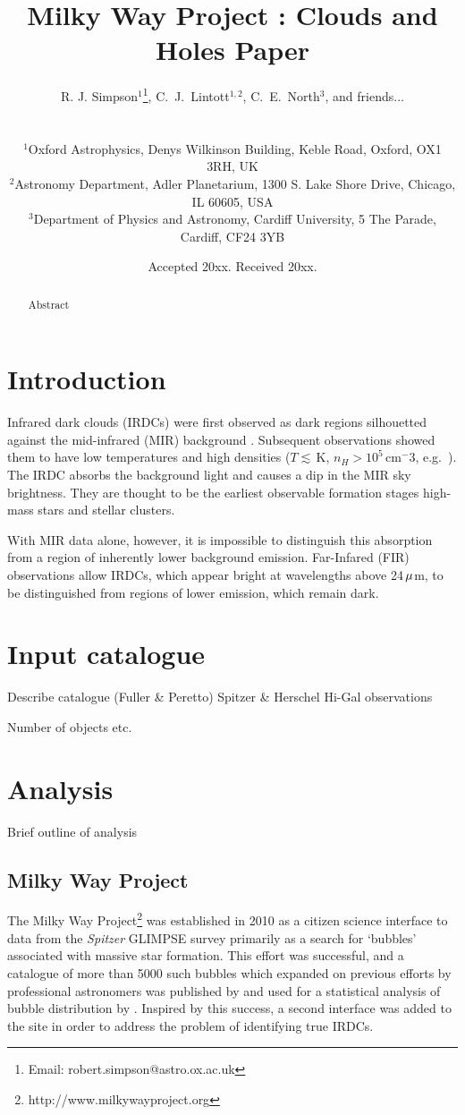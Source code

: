 \documentclass[a4,useAMS,usenatbib]{mn2e}
\title{Milky Way Project : Clouds and Holes Paper}
\author[Simpson et al.]
{\parbox{\textwidth}{R. J. Simpson$^{1}$\thanks{Email: robert.simpson@astro.ox.ac.uk},
C.~J.~Lintott$^{1,2}$,
C.~E.~North$^3$,
and friends...}\vspace{0.8cm}\\
\parbox{\textwidth}{
$^{1}$Oxford Astrophysics, Denys Wilkinson Building, Keble Road, Oxford, OX1 3RH, UK \\
$^{2}$Astronomy Department, Adler Planetarium, 1300 S. Lake Shore Drive, Chicago, IL 60605, USA \\
$^{3}$Department of Physics and Astronomy, Cardiff University, 5 The Parade, Cardiff, CF24 3YB }}
\def\mic{$\umu$m}
\begin{document}
\date{Accepted 20xx. Received 20xx.}

\pagerange{\pageref{firstpage}--\pageref{lastpage}} 

\maketitle

\label{firstpage}

\begin{abstract}
Abstract
\end{abstract}

\section{Introduction}
Infrared dark clouds (IRDCs) were first observed as dark regions
silhouetted against the mid-infrared (MIR) background
\citep{Wilcock2011}. Subsequent observations showed them to have low
temperatures and high densities ($T\lesssim$\,K, $n_H > 10^5$\,cm$^-3$,
e.g.~\citet{Egan98,Carey98,HennebellePerault02}). The IRDC absorbs the
background light and causes a dip in the MIR sky brightness. They are
thought to be the earliest observable formation stages high-mass stars
and stellar clusters.

With MIR data alone, however, it is impossible to distinguish this
absorption from a region of inherently lower background
emission. Far-Infared (FIR) observations allow IRDCs, which appear
bright at wavelengths above 24\,\mic, to be distinguished from regions
of lower emission, which remain dark. 


\section{Input catalogue}
Describe catalogue (Fuller \& Peretto)
Spitzer \& Herschel Hi-Gal observations

Number of objects etc.

\section{Analysis}
Brief outline of analysis

\subsection{Milky Way Project}
The Milky Way Project\footnote{http://www.milkywayproject.org} was established in 2010 as a citizen science interface to data from the \emph{Spitzer} GLIMPSE survey primarily as a search for `bubbles' associated with massive star formation. This effort was successful, and a catalogue of more than 5000 such bubbles which expanded on previous efforts by professional astronomers was published by \citet{Simpsonetal} and used for a statistical analysis of bubble distribution by \citet{Kendrewetal}. Inspired by this success, a second interface was added to the site in order to address the problem of identifying true IRDCs.
\end{document}
